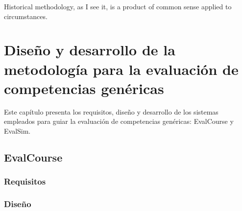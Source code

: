 

\begin{savequote}[50mm]
Historical methodology, as I see it, is a product of common sense applied to circumstances. 
\end{savequote}


\chapter{Diseño y desarrollo de la metodología para la evaluación de competencias genéricas}
\label{cha:Overall methodology}

\ifpdf
    \graphicspath{{3_overall_methodology/figures/PNG/}{3_overall_methodology/figures/PDF/}{3_overall_methodology/figures/}}
\else
    \graphicspath{{3_overall_methodology/figures/EPS/}{3_overall_methodology/figures/}}
\fi



\cite{turing1950computing}

Este capítulo presenta los requisitos, diseño y desarrollo de los sistemas empleados para guiar la evaluación de competencias genéricas: EvalCourse y EvalSim.



\section{EvalCourse}

\subsection{Requisitos}

\subsection{Diseño}

